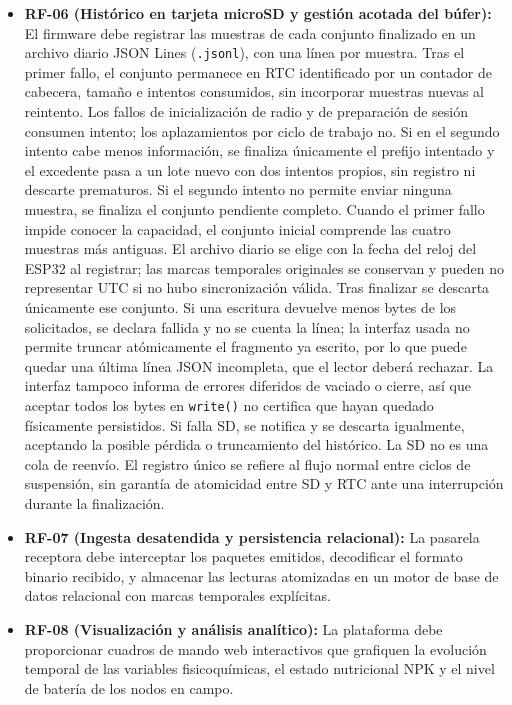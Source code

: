 \begin{itemize}
    \item \textbf{RF-06 (Histórico en tarjeta microSD y gestión acotada del búfer):} El firmware debe registrar las muestras de cada conjunto finalizado en un archivo diario JSON Lines (\texttt{.jsonl}), con una línea por muestra. Tras el primer fallo, el conjunto permanece en RTC identificado por un contador de cabecera, tamaño e intentos consumidos, sin incorporar muestras nuevas al reintento. Los fallos de inicialización de radio y de preparación de sesión consumen intento; los aplazamientos por ciclo de trabajo no. Si en el segundo intento cabe menos información, se finaliza únicamente el prefijo intentado y el excedente pasa a un lote nuevo con dos intentos propios, sin registro ni descarte prematuros. Si el segundo intento no permite enviar ninguna muestra, se finaliza el conjunto pendiente completo. Cuando el primer fallo impide conocer la capacidad, el conjunto inicial comprende las cuatro muestras más antiguas. El archivo diario se elige con la fecha del reloj del ESP32 al registrar; las marcas temporales originales se conservan y pueden no representar UTC si no hubo sincronización válida. Tras finalizar se descarta únicamente ese conjunto. Si una escritura devuelve menos bytes de los solicitados, se declara fallida y no se cuenta la línea; la interfaz usada no permite truncar atómicamente el fragmento ya escrito, por lo que puede quedar una última línea JSON incompleta, que el lector deberá rechazar. La interfaz tampoco informa de errores diferidos de vaciado o cierre, así que aceptar todos los bytes en \texttt{write()} no certifica que hayan quedado físicamente persistidos. Si falla SD, se notifica y se descarta igualmente, aceptando la posible pérdida o truncamiento del histórico. La SD no es una cola de reenvío. El registro único se refiere al flujo normal entre ciclos de suspensión, sin garantía de atomicidad entre SD y RTC ante una interrupción durante la finalización.
    \item \textbf{RF-07 (Ingesta desatendida y persistencia relacional):} La pasarela receptora debe interceptar los paquetes emitidos, decodificar el formato binario recibido, y almacenar las lecturas atomizadas en un motor de base de datos relacional con marcas temporales explícitas.
    \item \textbf{RF-08 (Visualización y análisis analítico):} La plataforma debe proporcionar cuadros de mando web interactivos que grafiquen la evolución temporal de las variables fisicoquímicas, el estado nutricional NPK y el nivel de batería de los nodos en campo.
\end{itemize}

